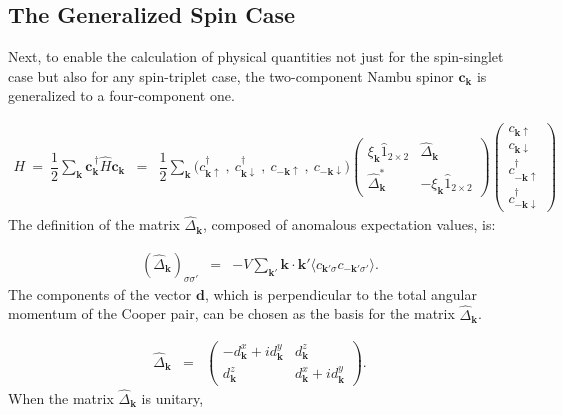\documentclass[uplatex,a4j,12pt,dvipdfmx]{jsarticle}
\begin{document}
\subsection{The Generalized Spin Case}

Next, to enable the calculation of physical quantities not just for the spin-singlet case but also for any spin-triplet case, the two-component Nambu spinor $\bm{c}_{\bm{k}}$ is generalized to a four-component one.

\begin{eqnarray}
	H
	\ = \
	\dfrac{1}{2}
	\sum_{\bm{k}}
	\bm{c}^{\ \dagger}_{\bm{k}}
	\hat{H}
	\bm{c}_{\bm{k}}
	&=&
	\dfrac{1}{2}
	\sum_{\bm{k}}
	\big( c^{\dagger}_{\bm{k} \uparrow} \ , \ c^{\dagger}_{\bm{k} \downarrow} \ , \ c_{-\bm{k} \uparrow} \ , \ c_{-\bm{k} \downarrow}  \big)
	\!\!\!
	\left(
	\begin{array}{cc}
			\xi_{\bm{k}} \hat{1}_{2 \times 2} & \hat{\Delta}_{\bm{k}}               \\[3mm]
			\hat{\Delta}^{*}_{\bm{k}}         & - \xi_{\bm{k}} \hat{1}_{2 \times 2}
		\end{array}
	\right)
	\!\!\!
	\left(
	\begin{array}{c}
			c_{\bm{k} \uparrow}            \\[2mm]
			c_{\bm{k} \downarrow}          \\[2mm]
			c^{\dagger}_{-\bm{k} \uparrow} \\[2mm]
			c^{\dagger}_{-\bm{k} \downarrow}
		\end{array}
	\right)
\end{eqnarray}
%
The definition of the matrix $\hat{\Delta}_{\bm{k}}$, composed of anomalous expectation values, is:

\begin{eqnarray}
	(\hat{\Delta}_{\bm{k}})_{\sigma\sigma'}
	&=&
	-V \sum_{\bm{k}'} \bm{k} \cdot \bm{k'}
	\big\langle c_{\bm{k'} \sigma} c_{-\bm{k}' \sigma'} \big\rangle
	.
\end{eqnarray}
%
The components of the vector $\bm{d}$, which is perpendicular to the total angular momentum of the Cooper pair, can be chosen as the basis for the matrix $\hat{\Delta}_{\bm{k}}$.

\begin{eqnarray}
	\hat{\Delta}_{\bm{k}}
	&=&
	\left(
	\begin{array}{cc}
			- d^{x}_{\bm{k}} + i d^{y}_{\bm{k}} & d^{z}_{\bm{k}}                    \\[2mm]
			d^{z}_{\bm{k}}                      & d^{x}_{\bm{k}} + i d^{y}_{\bm{k}}
		\end{array}
	\right)
	.
\end{eqnarray}
%
When the matrix $\hat{\Delta}_{\bm{k}}$ is unitary,
\end{document}
